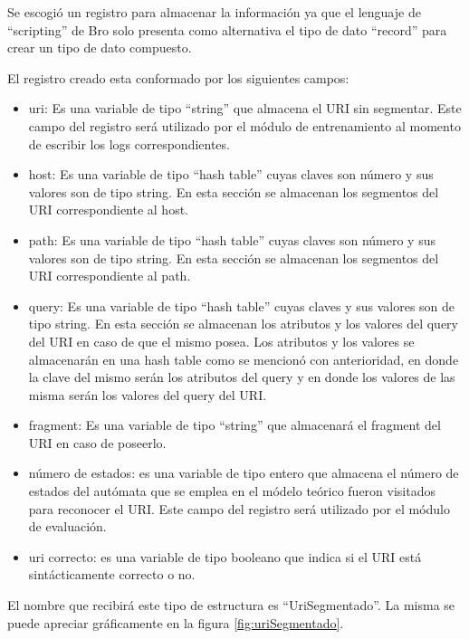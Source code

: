 Se escogió un registro para almacenar la información ya que el lenguaje de ``scripting'' de Bro solo presenta como alternativa el tipo de dato ``record'' para crear un tipo de dato compuesto. 

El registro creado esta conformado por los siguientes campos:
\begin{itemize}
\item uri: Es una variable de tipo ``string'' que almacena el URI sin segmentar. Este campo del registro será utilizado por el módulo de entrenamiento al momento de escribir los logs correspondientes.
\item host: Es una variable de tipo ``hash table'' cuyas claves son número y sus valores  son de tipo string. En esta sección se almacenan los segmentos del URI correspondiente al host.
\item path: Es una variable de tipo ``hash table'' cuyas claves son número y sus valores  son de tipo string. En esta sección se almacenan los segmentos del URI correspondiente al path.
\item query: Es una variable de tipo ``hash table'' cuyas claves y sus valores son de tipo string. En esta sección se almacenan los atributos y los valores del query del URI en caso de que el mismo posea. Los atributos y los valores se almacenarán en una hash table como se mencionó con anterioridad, en donde la clave del mismo serán los atributos del query y en donde los valores de las misma serán los valores del query del URI.
\item fragment: Es una variable de tipo ``string'' que almacenará el fragment del URI en caso de poseerlo.
\item número de estados: es una variable de tipo entero que almacena el número de estados del autómata que se emplea en el módelo teórico fueron visitados para reconocer el URI. Este campo del registro será utilizado por el módulo de evaluación.
\item uri correcto: es una variable de tipo booleano que indica si el URI está sintácticamente correcto o no.
\end{itemize}

El nombre que recibirá este tipo de estructura es ``UriSegmentado''. La misma se puede apreciar gráficamente en la figura \ref{fig:uriSegmentado}.


